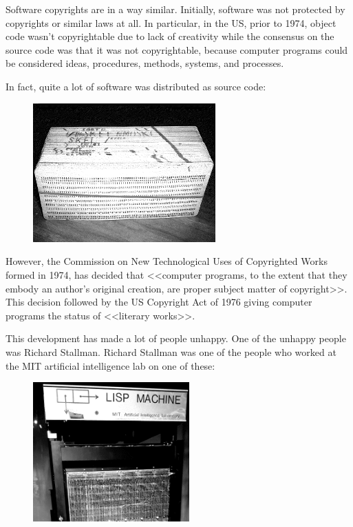 \documentclass[10pt, a5paper]{article}
\begin{document}
Software copyrights are in a way similar. Initially, software was not protected by copyrights or similar laws at all. In particular, in the US, prior to 1974, object code wasn't copyrightable due to lack of creativity while the consensus on the source code was that it was not copyrightable, because computer programs could be considered ideas, procedures, methods, systems, and processes.

In fact, quite a lot of software was distributed as source code: 
\begin{center}
\begin{figure}[h!]
  \centering
  \includegraphics[width=7cm]{14_2019_Shadura2.jpg}
  
  \label{fig2}
\end{figure}
\end{center}

However, the Commission on New Technological Uses of Copyrighted Works formed in 1974, has decided that <<computer programs, to the extent that they embody an author's original creation, are proper subject matter of copyright>>. This decision followed by the US Copyright Act of 1976 giving computer programs the status of <<literary works>>.

This development has made a lot of people unhappy. One of the unhappy people was Richard Stallman. Richard Stallman was one of the people who worked at the MIT artificial intelligence lab on one of these:

\begin{center}
\begin{figure}[h!]
  \centering
  \includegraphics[width=6cm]{14_2019_Shadura3.jpg}
  
  \label{fig3}
\end{figure}
\end{center}
\end{document}
